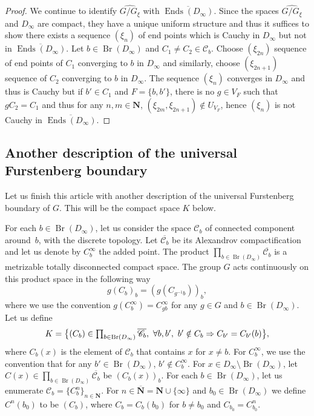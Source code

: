 \documentclass[JEP,XML,SOM,Unicode,NoFloatCountersInSection]{cedram}
\newcommand\implique{\mathchoice{\implies}{\Rightarrow}{\Rightarrow}{\Rightarrow}}
\let\mathcal\mathscr
\theoremstyle{plain}
\theoremstyle{definition}
\newcommand{\NN}{\mathbf{N}}
\newcommand{\cC}{\mathcal{C}}
\DeclareMathOperator{\Ends}{Ends}
\DeclareMathOperator{\Br}{Br}
\begin{document}
\begin{proof}We continue to identify $\widehat{G/G_\xi}$ with $\overline{\Ends(D_\infty)}$. Since the spaces $\widehat{G/G_\xi}$ and $D_\infty$ are compact, they have a unique uniform structure and thus it suffices to show there exists a sequence $(\xi_n)$ of end points which is Cauchy in $D_\infty$ but not in $\overline{\Ends(D_\infty)}$. Let $b\in \Br(D_\infty)$ and $C_1\neq C_2\in \cC_b$. Choose $(\xi_{2n})$ sequence of end points of $C_1$ converging to $b$ in $D_\infty$ and similarly, choose $(\xi_{2n+1})$ sequence of $C_2$ converging to $b$ in $D_\infty$. The sequence $(\xi_n)$ converges in $D_\infty$ and thus is Cauchy but if $b'\in C_1$ and $F=\{b,b'\}$, there is no $g\in V_F$ such that $gC_2=C_1$ and thus for any $n,m\in\NN$, $(\xi_{2m},\xi_{2n+1})\notin U_{V_F}$, hence $(\xi_n)$ is not Cauchy in $\overline{\Ends(D_\infty)}$.
\end{proof}

\subsection{Another description of the universal Furstenberg boundary}\label{isomorphic} Let us finish this article with another description of the universal Furstenberg boundary of $G$. This will be the compact space $K$ below.

For each $b\in\Br(D_\infty)$, let us consider the space $\cC_b$ of connected component around~$b$, with the discrete topology. Let $\overline{\cC_b}$ be its Alexandrov compactification and let us denote by $C_b^\infty$ the added point. The product $\prod_{b\in\Br(D_\infty)}\overline{\cC_b}$ is a metrizable totally disconnected compact space. The group $G$ acts continuously on this product space in the following way
\[
g(C_b)_{b}=(g(C_{g^{-1}b}))_b,
\]
where we use the convention $g(C_b^\infty)=C_{gb}^\infty$ for any $g\in G$ and $b\in \Br(D_\infty)$. Let us define
\[
K=\bigl\{(C_b)\in \textstyle\prod_{b\in\Br(D_\infty)}\overline{\cC_b},\ \forall b,b',\ b'\notin C_b \implique C_{b'}=C_{b'}(b)\bigr\},
\]
where $C_b(x)$ is the element of $\cC_b$ that contains $x$ for $x\neq b$. For $C_b^\infty$, we use the convention that for any $b'\in\Br(D_\infty)$, $b'\notin C_b^\infty$.
For $x\in D_\infty\setminus\Br(D_\infty)$, let $C(x)\in \prod_{b\in\Br(D_\infty)}\overline{\cC_b}$ be $(C_b(x))_b$. For each $b\in\Br(D_\infty)$, let us enumerate $\cC_{b}=\{C_b^n\}_{n\in\NN}$. For $n\in\overline{\NN}=\NN\cup\{\infty\}$ and $b_0\in\Br(D_\infty)$ we define $C^n(b_0)$ to be $(C_b)$, where $C_b=C_b(b_0)$ for $b\neq b_0$ and $C_{b_0}=C_{b_0}^n$.
\end{document}
